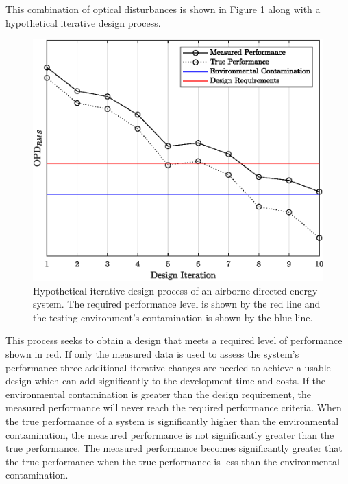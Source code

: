 This combination of optical disturbances is shown in Figure \ref{fig:01_design_iteration} along with a hypothetical iterative design process.
\begin{figure}
  \centering
  \includegraphics{../matlab/01_introduction/design_iteration.eps}
  \caption{Hypothetical iterative design process of an airborne directed-energy system.  The required performance level is shown by the red line and the testing environment's contamination is shown by the blue line.}
  \label{fig:01_design_iteration}
\end{figure}
This process seeks to obtain a design that meets a required level of performance shown in red.
If only the measured data is used to assess the system's performance three additional iterative changes are needed to achieve a usable design which can add significantly to the development time and costs.
If the environmental contamination is greater than the design requirement, the measured performance will never reach the required performance criteria.
When the true performance of a system is significantly higher than the environmental contamination, the measured performance is not significantly greater than the true performance.
The measured performance becomes significantly greater that the true performance when the true performance is less than the environmental contamination.

